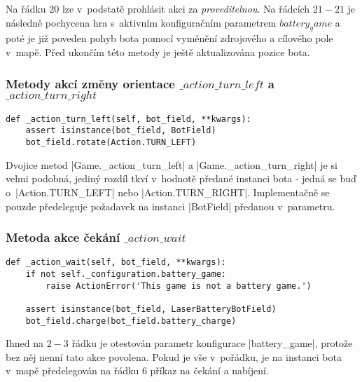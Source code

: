 Na řádku $20$ lze v~podstatě prohlásit akci za \emph{proveditelnou}. Na řádcích $21-21$ je následně pochycena hra s~aktivním konfiguračním parametrem $battery_game$ a poté je již poveden pohyb bota pomocí vyměnění zdrojového a cílového pole v~mapě. Před ukončím této metody je ještě aktualizována pozice bota.

\subsubsection[Metody akcí změny orientace]{Metody akcí změny orientace $\_action\_turn\_left$ a $\_action\_turn\_right$}
\vspace{-10pt}
\begin{lstlisting}[caption={Metoda $Game.\_action\_turn\_left$},label={lst:game-action-turn-left}]
def _action_turn_left(self, bot_field, **kwargs):
    assert isinstance(bot_field, BotField)
    bot_field.rotate(Action.TURN_LEFT)
\end{lstlisting}

Dvojice metod \ic|Game._action_turn_left| a \ic|Game._action_turn_right| je si velmi podobná, jediný rozdíl tkví v~hodnotě předané instanci bota - jedná se buď o~\ic|Action.TURN_LEFT| nebo \ic|Action.TURN_RIGHT|. Implementačně se pouzde předeleguje požadavek na instanci \ic|BotField| předanou v~parametru.

\subsubsection{Metoda akce čekání $\_action\_wait$}
\vspace{-10pt}
\begin{lstlisting}[caption={Metoda $Game.\_action\_wait$},label={lst:game-action-wait}]
def _action_wait(self, bot_field, **kwargs):
    if not self._configuration.battery_game:
        raise ActionError('This game is not a battery game.')

    assert isinstance(bot_field, LaserBatteryBotField)
    bot_field.charge(bot_field.battery_charge)
\end{lstlisting}

Ihned na $2-3$ řádku je otestován parametr konfigurace \ic|battery_game|, protože bez něj nenní tato akce povolena. Pokud je vše v~pořádku, je na instanci bota v~mapě předelegován na řádku $6$ příkaz na čekání a nabíjení.

